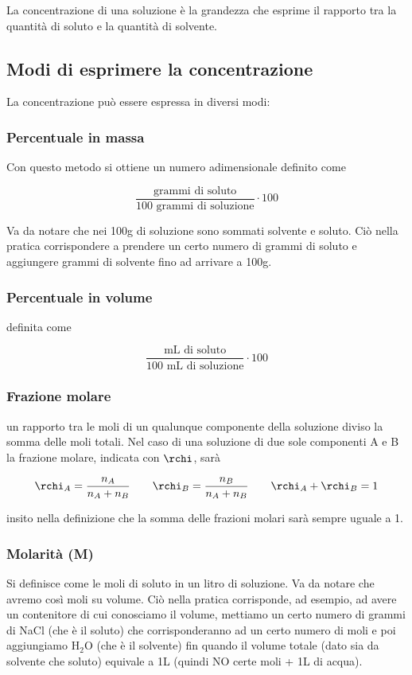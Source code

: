La concentrazione di una soluzione è la grandezza che esprime il rapporto tra la quantità di soluto e la quantità di solvente.
\subsection{Modi di esprimere la concentrazione}
La concentrazione può essere espressa in diversi modi:
\subsubsection{Percentuale in massa}
Con questo metodo si ottiene un numero adimensionale definito come

$$ \frac{\text{grammi di soluto}}{100\text{ grammi di soluzione}} \cdot 100$$

Va da notare che nei 100g di soluzione sono sommati solvente e soluto. Ciò nella pratica corrispondere a prendere un certo numero di grammi di soluto e aggiungere grammi di solvente fino ad arrivare a 100g.
\subsubsection{Percentuale in volume}
\E definita come

$$ \frac{\text{mL di soluto}}{100\text{ mL di soluzione}} \cdot 100$$

\subsubsection{Frazione molare}
\E un rapporto tra le moli di un qualunque componente della soluzione diviso la somma delle moli totali. Nel caso di una soluzione di due sole componenti A e B la frazione molare, indicata con $\rchi$, sarà

$$\rchi_A=\frac{n_A}{n_A + n_B}
\qquad
\rchi_B=\frac{n_B}{n_A + n_B}
\qquad
\rchi_A + \rchi_B = 1$$

\E insito nella definizione che la somma delle frazioni molari sarà sempre uguale a 1.
\subsubsection{Molarità (M)}
Si definisce come le moli di soluto in un litro di soluzione. Va da notare che avremo così moli su volume. Ciò nella pratica corrisponde, ad esempio, ad avere un contenitore di cui conosciamo il volume, mettiamo un certo numero di grammi di NaCl (che è il soluto) che corrisponderanno ad un certo numero di moli e poi aggiungiamo H$_2$O (che è il solvente) fin quando il volume totale (dato sia da solvente che soluto) equivale a 1L (quindi NO certe moli + 1L di acqua).
